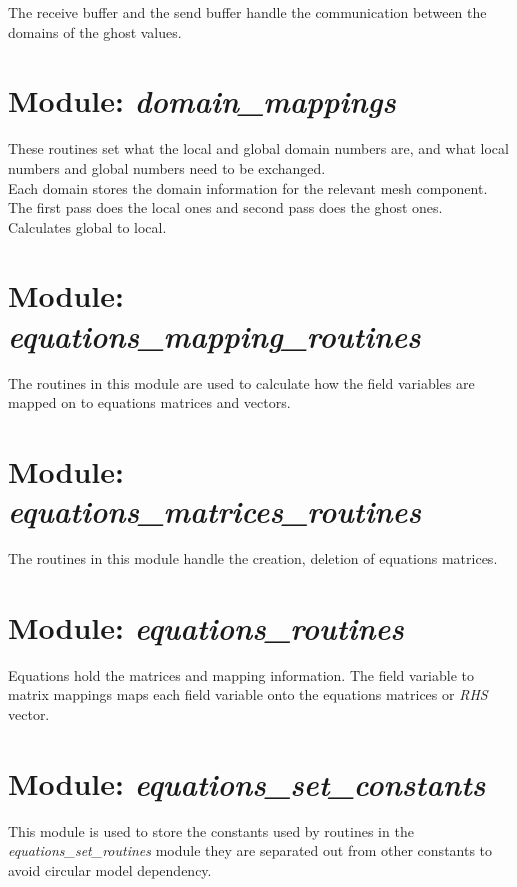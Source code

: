 The receive buffer and the send buffer handle the communication between the 
domains of the ghost values.


\section{Module: \emph{domain\_mappings}} 
\label{sec:domainmappings}

These routines set what the local and global domain numbers are, and what 
local numbers and global numbers need to be exchanged. \\
Each domain stores the domain information for the relevant mesh component. \\
The first pass does the local ones and second pass does the ghost ones. \\
Calculates global to local.


\section{Module: \emph{equations\_mapping\_routines}}
\label{sec:equationsmappingroutines}

The routines in this module are used to calculate how the field variables 
are mapped on to equations matrices and vectors.


\section{Module: \emph{equations\_matrices\_routines}}
\label{sec:equationsmatricesroutines}

The routines in this module handle the creation, deletion of equations 
matrices.


\section{Module: \emph{equations\_routines}}
\label{sec:equationsroutines}

Equations hold the matrices and mapping information. The field variable 
to matrix mappings maps each field variable onto the equations matrices or 
\emph{RHS} vector.


\section{Module: \emph{equations\_set\_constants}}
\label{sec:equationssetconstants}

This module is used to store the constants used by routines in the \\
\emph{equations\_set\_routines} module they are separated out from 
other constants to avoid circular model dependency.


